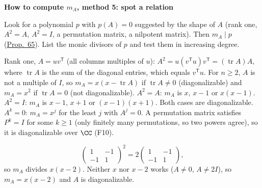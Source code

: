 \documentclass[10pt]{scrartcl}
\DeclareMathOperator{\tr}{tr}\DeclareMathOperator{\nul}{null}\DeclareMathOperator{\range}{range}\DeclareMathOperator{\spn}{span}
\newenvironment{methodbox}[1]{\begin{mdframed}[style=mdbluebox,linecolor=NavyBlue,backgroundcolor=NavyBlue!3]\textbf{\color{NavyBlue}#1}\par\vspace{2pt}}{\end{mdframed}}
\begin{document}
\begin{methodbox}{How to compute $m_A$, method 5: spot a relation}
\begin{enumerate}[label=\arabic*.,leftmargin=1.5em,itemsep=2pt,topsep=2pt]
  \ii Look for a polynomial $p$ with $p(A)=0$ suggested by the shape of $A$ (rank one, $A^2=A$, $A^2=I$, a permutation matrix, a nilpotent matrix).
  \ii Then $m_A\mid p$ (\hyperref[prop-65]{Prop.~65}). List the monic divisors of $p$ and test them in increasing degree.
\end{enumerate}
\end{methodbox}
\begin{itemize}
  \ii Rank one, $A=uv^{\mathsf T}$ (all columns multiples of $u$): $A^2=u(v^{\mathsf T}u)v^{\mathsf T}=(\tr A)A$, where $\tr A$ is the sum of the diagonal entries, which equals $v^{\mathsf T}u$. For $n\ge2$, $A$ is not a multiple of $I$, so $m_A=x(x-\tr A)$ if $\tr A\ne0$ (diagonalizable) and $m_A=x^2$ if $\tr A=0$ (not diagonalizable).
  \ii $A^2=A$: $m_A$ is $x$, $x-1$ or $x(x-1)$. $A^2=I$: $m_A$ is $x-1$, $x+1$ or $(x-1)(x+1)$. Both cases are diagonalizable. $A^k=0$: $m_A=x^j$ for the least $j$ with $A^j=0$.
  \ii A permutation matrix satisfies $P^k=I$ for some $k\ge1$ (only finitely many permutations, so two powers agree), so it is diagonalizable over $\CC$ (F10).
\end{itemize}
\begin{example*}
  \[ \begin{pmatrix}1&-1\\-1&1\end{pmatrix}^2 = 2\begin{pmatrix}1&-1\\-1&1\end{pmatrix}, \]
  so $m_A$ divides $x(x-2)$. Neither $x$ nor $x-2$ works ($A\ne0$, $A\ne2I$), so $m_A=x(x-2)$ and $A$ is diagonalizable.
\end{example*}
\end{document}

